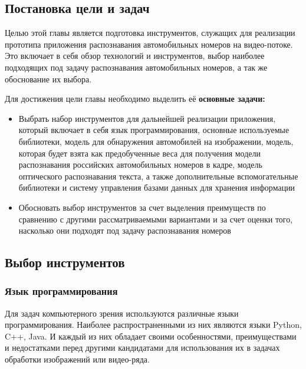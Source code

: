 \documentclass[a4paper,12pt]{article}
\begin{document}
\subsection{Постановка цели и задач}

Целью этой главы является подготовка инструментов, служащих для реализации прототипа приложения распознавания автомобильных номеров на видео-потоке. Это включает в себя обзор технологий и инструментов, выбор наиболее подходящих под задачу распознавания автомобильных номеров, а так же обоснование их выбора.

Для достижения цели главы необходимо выделить её \textbf{основные задачи:}
\begin{itemize}
    \item Выбрать набор инструментов для дальнейшей реализации приложения, который включает в себя язык программирования, основные используемые библиотеки, модель для обнаружения автомобилей на изображении, модель, которая будет взята как предобученные веса для получения модели распознавания российских автомобильных номеров в кадре, модель оптического распознавания текста, а также дополнительные вспомогательные библиотеки и систему управления базами данных для хранения информации
    \item Обосновать выбор инструментов за счет выделения преимуществ по сравнению с другими рассматриваемыми вариантами и за счет оценки того, насколько они подходят под задачу распознавания номеров 
\end{itemize}

\subsection{Выбор инструментов}

\subsubsection{Язык программирования}

Для задач компьютерного зрения используются различные языки программирования. Наиболее распространенными из них являются языки Python, C++, Java. И каждый из них обладает своими особенностями, преимуществами и недостатками перед другими кандидатами для использования их в задачах обработки изображений или видео-ряда.
\end{document}
